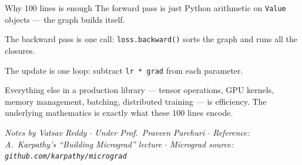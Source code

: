 \documentclass[12pt,a4paper]{article}
\newcommand{\code}[1]{\texttt{\small\color{deepblue}#1}}
\begin{document}
\begin{center}
\end{center}

\begin{conceptbox}{Why 100 lines is enough}
The forward pass is just Python arithmetic on \code{Value} objects — the graph builds itself.

The backward pass is one call: \code{loss.backward()} sorts the graph and runs all the closures.

The update is one loop: subtract \code{lr * grad} from each parameter.

Everything else in a production library — tensor operations, GPU kernels, memory management, batching, distributed training — is efficiency. The underlying mathematics is exactly what these 100 lines encode.
\end{conceptbox}

\vfill
\begin{center}
{\small\color{gray}\itshape
Notes by Vatsav Reddy $\cdot$ Under Prof.\ Praveen Parchuri $\cdot$
Reference: A.\ Karpathy's ``Building Micrograd'' lecture $\cdot$
Micrograd source: \texttt{github.com/karpathy/micrograd}
}
\end{center}
\end{document}
